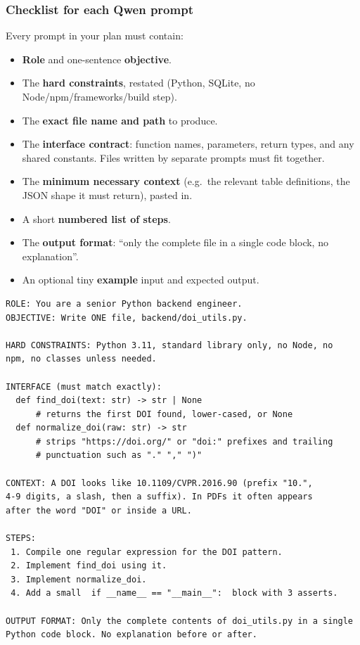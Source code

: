 \documentclass[11pt,a4paper]{article}
\begin{document}
\subsubsection{Checklist for each Qwen prompt}
Every prompt in your plan must contain:
\begin{itemize}[label=$\square$]
\item \textbf{Role} and one-sentence \textbf{objective}.
\item The \textbf{hard constraints}, restated (Python, SQLite, no Node/npm/frameworks/build step).
\item The \textbf{exact file name and path} to produce.
\item The \textbf{interface contract}: function names, parameters, return types, and any shared constants. Files written by separate prompts must fit together.
\item The \textbf{minimum necessary context} (e.g.\ the relevant table definitions, the JSON shape it must return), pasted in.
\item A short \textbf{numbered list of steps}.
\item The \textbf{output format}: ``only the complete file in a single code block, no explanation''.
\item An optional tiny \textbf{example} input and expected output.
\end{itemize}

\begin{tcolorbox}[enhanced,breakable,colback=white,colframe=black!40,boxrule=0.5pt,arc=2pt,title={\bfseries Illustration only: what one good prompt looks like (for a different module than you will write)},fonttitle=\small\bfseries]
\begin{lstlisting}[frame=none,backgroundcolor=\color{white},xleftmargin=0pt]
ROLE: You are a senior Python backend engineer.
OBJECTIVE: Write ONE file, backend/doi_utils.py.

HARD CONSTRAINTS: Python 3.11, standard library only, no Node, no
npm, no classes unless needed.

INTERFACE (must match exactly):
  def find_doi(text: str) -> str | None
      # returns the first DOI found, lower-cased, or None
  def normalize_doi(raw: str) -> str
      # strips "https://doi.org/" or "doi:" prefixes and trailing
      # punctuation such as "." "," ")"

CONTEXT: A DOI looks like 10.1109/CVPR.2016.90 (prefix "10.",
4-9 digits, a slash, then a suffix). In PDFs it often appears
after the word "DOI" or inside a URL.

STEPS:
 1. Compile one regular expression for the DOI pattern.
 2. Implement find_doi using it.
 3. Implement normalize_doi.
 4. Add a small  if __name__ == "__main__":  block with 3 asserts.

OUTPUT FORMAT: Only the complete contents of doi_utils.py in a single
Python code block. No explanation before or after.
\end{lstlisting}
\end{tcolorbox}
\end{document}
